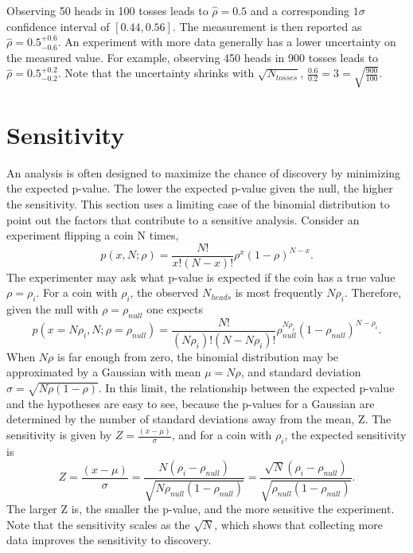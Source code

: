 Observing 50 heads in 100 tosses leads to $\hat{\rho} = 0.5$ and a corresponding $1\sigma$ confidence interval of $[0.44, 0.56]$. The measurement is then reported as $\hat{\rho} = 0.5^{+0.6}_{-0.6}$. An experiment with more data generally has a lower uncertainty on the measured value. For example, observing 450 heads in 900 tosses leads to $\hat{\rho} = 0.5^{+0.2}_{-0.2}$. Note that the uncertainty shrinks with $\sqrt{N_{tosses}}$, $\frac{0.6}{0.2} = 3 = \sqrt{\frac{900}{100}}$.

\section{Sensitivity}

An analysis is often designed to maximize the chance of discovery by minimizing the expected p-value. The lower the expected p-value given the null, the higher the sensitivity. This section uses a limiting case of the binomial distribution to point out the factors that contribute to a sensitive analysis. Consider an experiment flipping a coin N times, 
\begin{equation}
p(x,N;\rho) = \frac{N!}{x! (N - x)!}\rho^{x}(1-\rho)^{N-x}.
\end{equation}
The experimenter may ask what p-value is expected if the coin has a true value $\rho=\rho_i$. For a coin with $\rho_i$, the observed $N_{heads}$ is most frequently $N\rho_i$. Therefore, given the null with $\rho=\rho_{null}$ one expects
\begin{equation}
p(x=N\rho_i,N;\rho=\rho_{null}) = \frac{N!}{(N\rho_i)! (N - N\rho_i)!}\rho_{null}^{N\rho_i}(1-\rho_{null})^{N-\rho_i}.
\end{equation}
When $N\rho$ is far enough from zero, the binomial distribution may be approximated by a Gaussian with mean $\mu=N\rho$, and standard deviation $\sigma=\sqrt{N\rho(1-\rho)}$. In this limit, the relationship between the expected p-value and the hypotheses are easy to see, because the p-values for a Gaussian are determined by the number of standard deviations away from the mean, Z. The sensitivity is given by $Z=\frac{(x-\mu)}{\sigma}$, and for a coin with $\rho_i$, the expected sensitivity is 
\begin{equation}
Z = \frac{(x-\mu)}{\sigma} = \frac{N(\rho_i - \rho_{null})}{\sqrt{N\rho_{null}(1-\rho_{null})}} = \frac{\sqrt{N}(\rho_i - \rho_{null})}{\sqrt{\rho_{null}(1-\rho_{null})}}.
\end{equation}
The larger Z is, the smaller the p-value, and the more sensitive the experiment. Note that the sensitivity scales as the $\sqrt{N}$, which shows that collecting more data improves the sensitivity to discovery. 

